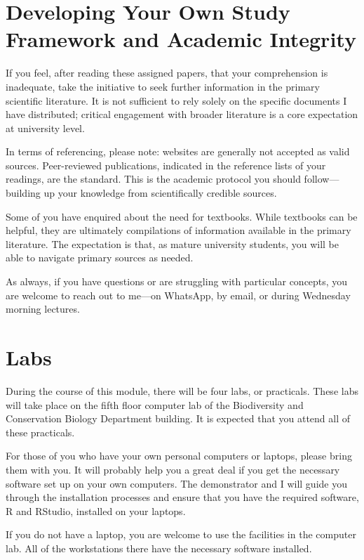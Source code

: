 \documentclass[
  10pt,
]{book}
\begin{document}
\section{Developing Your Own Study Framework and Academic
Integrity}\label{developing-your-own-study-framework-and-academic-integrity}

If you feel, after reading these assigned papers, that your
comprehension is inadequate, take the initiative to seek further
information in the primary scientific literature. It is not sufficient
to rely solely on the specific documents I have distributed; critical
engagement with broader literature is a core expectation at university
level.

In terms of referencing, please note: websites are generally not
accepted as valid sources. Peer-reviewed publications, indicated in the
reference lists of your readings, are the standard. This is the academic
protocol you should follow---building up your knowledge from
scientifically credible sources.

Some of you have enquired about the need for textbooks. While textbooks
can be helpful, they are ultimately compilations of information
available in the primary literature. The expectation is that, as mature
university students, you will be able to navigate primary sources as
needed.

As always, if you have questions or are struggling with particular
concepts, you are welcome to reach out to me---on WhatsApp, by email, or
during Wednesday morning lectures.

\section{Labs}\label{labs}

During the course of this module, there will be four labs, or
practicals. These labs will take place on the fifth floor computer lab
of the Biodiversity and Conservation Biology Department building. It is
expected that you attend all of these practicals.

For those of you who have your own personal computers or laptops, please
bring them with you. It will probably help you a great deal if you get
the necessary software set up on your own computers. The demonstrator
and I will guide you through the installation processes and ensure that
you have the required software, R and RStudio, installed on your
laptops.

If you do not have a laptop, you are welcome to use the facilities in
the computer lab. All of the workstations there have the necessary
software installed.
\end{document}
